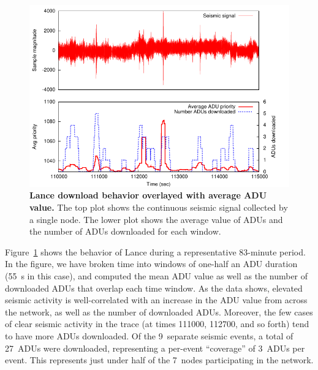 \begin{figure}[t]
\begin{center}
\includegraphics[width=1.0\hsize]{./4-lance/figs/everything.pdf}
\end{center}

\caption{\textbf{Lance download behavior overlayed with average ADU value.}
The top plot shows the continuous seismic signal collected by a single node.
The lower plot shows the average value of ADUs and the number of ADUs
downloaded for each window.}

\label{lance-fig-everything}
\end{figure}

Figure~\ref{lance-fig-everything} shows the behavior of Lance during a
representative 83-minute period. In the figure, we have broken time into
windows of one-half an ADU duration (55~s in this case), and computed the
mean ADU value as well as the number of downloaded ADUs that overlap each
time window. As the data shows, elevated seismic activity is well-correlated
with an increase in the ADU value from across the network, as well as the
number of downloaded ADUs. Moreover, the few cases of clear seismic activity
in the trace (at times 111000, 112700, and so forth) tend to have more ADUs
downloaded. Of the 9~separate seismic events, a total of 27~ADUs were
downloaded, representing a per-event ``coverage'' of 3~ADUs per event. This
represents just under half of the 7~nodes participating in the network.
